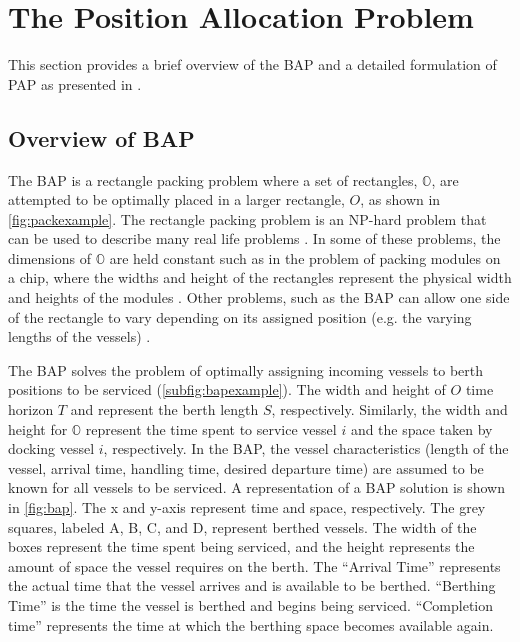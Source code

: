 \section{The Position Allocation Problem}
\label{sec:positionallocationproblem}
This section provides a brief overview of the BAP and a detailed formulation of PAP as presented in \cite{Qarebagh2019}.

\subsection{Overview of BAP}
The BAP is a rectangle packing problem where a set of rectangles, $\mathbb{O}$, are attempted to be optimally placed in
a larger rectangle, $O$, as shown in \autoref{fig:packexample}. The rectangle packing problem is an NP-hard problem that
can be used to describe many real life problems \cite{Bruin2013,Murata1995}. In some of these problems, the dimensions
of $\mathbb{O}$ are held constant such as in the problem of packing modules on a chip, where the widths and height of
the rectangles represent the physical width and heights of the modules \cite{Murata1995}. Other problems, such as the
BAP can allow one side of the rectangle to vary depending on its assigned position (e.g. the varying lengths of the
vessels) \cite{Buhrkal2010}.

The BAP solves the problem of optimally assigning incoming vessels to berth positions to be serviced
(\autoref{subfig:bapexample}). The width and height of $O$ time horizon $T$ and represent the berth length $S$,
respectively. Similarly, the width and height for $\mathbb{O}$ represent the time spent to service vessel $i$ and the
space taken by docking vessel $i$, respectively. In the BAP, the vessel characteristics (length of the vessel, arrival
time, handling time, desired departure time) are assumed to be known for all vessels to be serviced. A representation of
a BAP solution is shown in \autoref{fig:bap}. The x and y-axis represent time and space, respectively. The grey squares,
labeled A, B, C, and D, represent berthed vessels. The width of the boxes represent the time spent being serviced, and
the height represents the amount of space the vessel requires on the berth. The ``Arrival Time'' represents the actual
time that the vessel arrives and is available to be berthed. ``Berthing Time'' is the time the vessel is berthed and
begins being serviced. ``Completion time'' represents the time at which the berthing space becomes available again.

